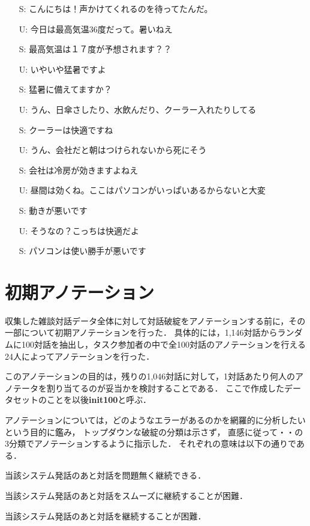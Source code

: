 \documentclass[japanese]{jnlp_1.4}
\newcommand{\maru}{}
\newcommand{\batsu}{}
\newcommand{\sankaku}{}
\renewcommand{\mod}[1]{}
\begin{document}
\vspace{\baselineskip}
\begin{itemize}
\itemsep=-1mm
\item[S:]       こんにちは！声かけてくれるのを待ってたんだ。
\item[U:]       今日は最高気温36度だって。暑いねえ
\item[S:]       最高気温は１７度が予想されます？？
\item[U:]       いやいや猛暑ですよ
\item[S:]       猛暑に備えてますか？
\item[U:]       うん、日傘さしたり、水飲んだり、クーラー入れたりしてる
\item[S:]       クーラーは快適ですね
\item[U:]       うん、会社だと朝はつけられないから死にそう
\item[S:]       会社は冷房が効きますよねえ
\item[U:]       昼間は効くね。ここはパソコンがいっぱいあるからないと大変
\item[S:]       動きが悪いです
\item[U:]       そうなの？こっちは快適だよ
\item[S:]       パソコンは使い勝手が悪いです
\end{itemize}


\section{初期アノテーション}\label{sec:annotation1}

収集した雑談対話データ全体に対して対話破綻をアノテーションする前に，その一部について初期アノテーションを行った．
具体的には，1,146対話からランダムに100対話を抽出し，タスク参加者の中で全100対話のアノテーションを行える24人によってアノテーションを行った．
\mod{作業期間は2014年10月7日から17日の間である．}
このアノテーションの目的は，残りの1,046対話に対して，1対話あたり何人のアノテータを割り当てるのが妥当かを検討することである．
ここで作成したデータセットのことを以後{\bf init100}と呼ぶ．

アノテーションについては，どのようなエラーがあるのかを網羅的に分析したいという目的に鑑み，
トップダウンな破綻の分類は示さず，
直感に従って\maru・\sankaku・\batsu の3分類でアノテーションするように指示した．
それぞれの意味は以下の通りである．

\vspace{\baselineskip}
\begin{description}
\setlength{\labelsep}{0.25zw}
\item[\maru\ 破綻ではない：]当該システム発話のあと対話を問題無く継続できる．\samepage
\item[\sankaku\ 破綻と言い切れないが，違和感を感じる発話：]当該システム発話のあと対話をスムーズに継続することが困難．\samepage
\item[\textmd{\batsu}\ 明らかにおかしいと思う発話（破綻）：]当該システム発話のあと対話を継続することが困難．\samepage
\end{description}
\vspace{\baselineskip}
\end{document}
